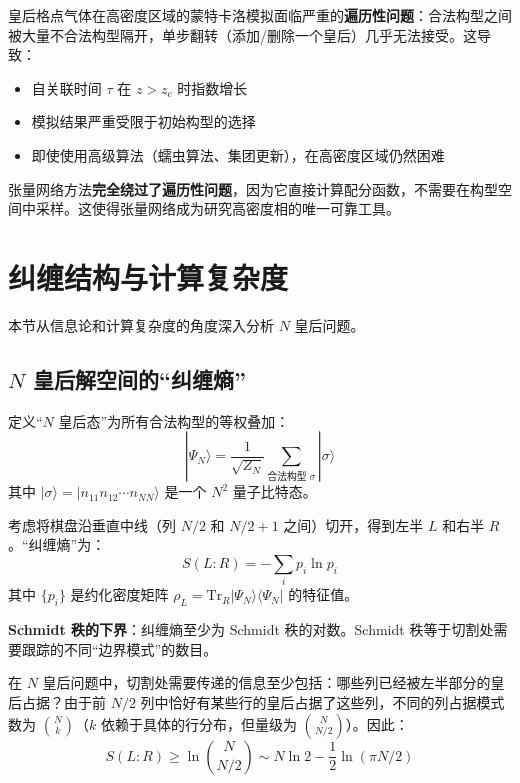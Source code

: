 \documentclass[12pt,a4paper]{ctexart}
\begin{document}
皇后格点气体在高密度区域的蒙特卡洛模拟面临严重的\textbf{遍历性问题}：合法构型之间被大量不合法构型隔开，单步翻转（添加/删除一个皇后）几乎无法接受。这导致：
\begin{itemize}
\item 自关联时间 $\tau$ 在 $z > z_c$ 时指数增长
\item 模拟结果严重受限于初始构型的选择
\item 即使使用高级算法（蠕虫算法、集团更新），在高密度区域仍然困难
\end{itemize}

张量网络方法\textbf{完全绕过了遍历性问题}，因为它直接计算配分函数，不需要在构型空间中采样。这使得张量网络成为研究高密度相的唯一可靠工具。


\section{纠缠结构与计算复杂度}

本节从信息论和计算复杂度的角度深入分析 $N$ 皇后问题。

\subsection{$N$ 皇后解空间的``纠缠熵''}

定义``$N$ 皇后态''为所有合法构型的等权叠加：
\begin{equation}
|\Psi_N\rangle = \frac{1}{\sqrt{Z_N}} \sum_{\text{合法构型 } \sigma} |\sigma\rangle
\end{equation}
其中 $|\sigma\rangle = |n_{11} n_{12} \cdots n_{NN}\rangle$ 是一个 $N^2$ 量子比特态。

考虑将棋盘沿垂直中线（列 $N/2$ 和 $N/2+1$ 之间）切开，得到左半 $L$ 和右半 $R$。``纠缠熵''为：
\begin{equation}
S(L:R) = -\sum_i p_i \ln p_i
\end{equation}
其中 $\{p_i\}$ 是约化密度矩阵 $\rho_L = \text{Tr}_R |\Psi_N\rangle\langle\Psi_N|$ 的特征值。

\textbf{Schmidt 秩的下界}：纠缠熵至少为 Schmidt 秩的对数。Schmidt 秩等于切割处需要跟踪的不同``边界模式''的数目。

在 $N$ 皇后问题中，切割处需要传递的信息至少包括：哪些列已经被左半部分的皇后占据？由于前 $N/2$ 列中恰好有某些行的皇后占据了这些列，不同的列占据模式数为 $\binom{N}{k}$（$k$ 依赖于具体的行分布，但量级为 $\binom{N}{N/2}$）。因此：
\begin{equation}
\boxed{S(L:R) \geq \ln \binom{N}{N/2} \sim N \ln 2 - \frac{1}{2} \ln(\pi N / 2)}
\end{equation}
\end{document}
